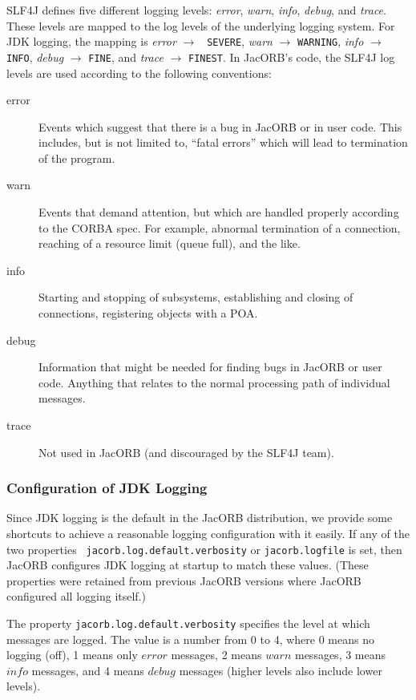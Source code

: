 SLF4J defines five different logging levels: \emph{error},
\emph{warn}, \emph{info}, \emph{debug}, and \emph{trace}.  These
levels are mapped to the log levels of the underlying logging system.
For JDK logging, the mapping is \emph{error} $\rightarrow$ {\tt
  SEVERE}, \emph{warn} $\rightarrow$ {\tt WARNING}, \emph{info}
$\rightarrow$ {\tt INFO}, \emph{debug} $\rightarrow$ {\tt FINE}, and
\emph{trace} $\rightarrow$ {\tt FINEST}.  In JacORB's code, the
SLF4J log levels are used according to the following conventions:

\begin{description}
\item[error] Events which suggest that there is a bug in JacORB or in
  user code.  This includes, but is not limited to, ``fatal errors''
  which will lead to termination of the program.

\item[warn] Events that demand attention, but which are handled
  properly according to the CORBA spec.  For example, abnormal
  termination of a connection, reaching of a resource limit (queue
  full), and the like.

\item[info] Starting and stopping of subsystems, establishing and
  closing of connections, registering objects with a POA.

\item[debug] Information that might be needed for finding bugs in
  JacORB or user code.  Anything that relates to the normal processing
  path of individual messages.

\item[trace] Not used in JacORB (and discouraged by the SLF4J team).
\end{description}

\subsubsection{Configuration of JDK Logging}

Since JDK logging is the default in the JacORB distribution, we
provide some shortcuts to achieve a reasonable logging configuration
with it easily.  If any of the two properties {\tt
  jacorb.log.default.verbosity} or {\tt jacorb.logfile} is set, then
JacORB configures JDK logging at startup to match these values.
(These properties were retained from previous JacORB versions where
JacORB configured all logging itself.)

The property {\tt jacorb.log.default.verbosity} specifies the level at
which messages are logged.  The value is a number from 0 to 4, where 0
means no logging (off), 1 means only $error$ messages, 2 means $warn$
messages, 3 means $info$ messages, and 4 means $debug$ messages (higher
levels also include lower levels).

